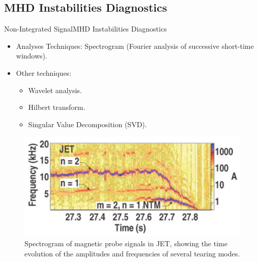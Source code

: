 \documentclass{beamer}
\begin{document}
\subsection{MHD Instabilities Diagnostics}
\begin{frame}{Non-Integrated Signal}{MHD Instabilities Diagnostics}
	\begin{itemize}
		\item Analyses Techniques: Spectrogram (Fourier analysis of successive short-time windows).
		\item Other techniques:
		\begin{itemize} 
			\item Wavelet  analysis.
			\item Hilbert transform.
			\item Singular Value Decomposition (SVD).
		\end{itemize}
	\end{itemize}
	\begin{figure}[ht]
		\begin{center}
			\includegraphics[width=0.6 \columnwidth]{SpectrogramJET.png}
			\caption{\small Spectrogram of magnetic probe signals in JET, showing the time evolution of the amplitudes and frequencies of several tearing modes.}
		\end{center}
	\end{figure}
\end{frame}
\end{document}
